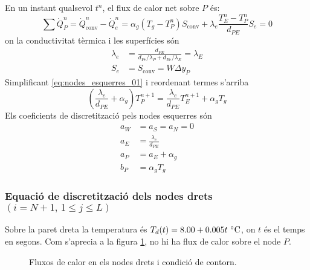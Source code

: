 \noindent
En un instant qualsevol $t^n$, el flux de calor net sobre $P$ és:
\begin{equation} \label{eq:nodes_esquerres_01}
	\sum \dot{Q}_P^n = 
	\dot{Q}_\text{conv}^n - \dot{Q}_e^n =
	\alpha_g \left( T_g - T_P^n \right) S_\text{conv} + 
	\lambda_e \frac{T_E^n - T_P^n}{d_{PE}} S_e = 0
\end{equation}
on la conductivitat tèrmica i les superfícies són
\begin{align}
	\lambda_e &= \frac{d_{PE}}{d_{Pe}/\lambda_P + d_{Ee}/\lambda_E} = \lambda_E \\
	S_e &= S_\text{conv} = W \Delta y_P 
\end{align}
Simplificant \eqref{eq:nodes_esquerres_01} i reordenant termes s'arriba 
\begin{equation} \label{eq:equacio_discretitzacio_nodes_esquerres}
	\left( \frac{\lambda_e}{d_{PE}} + \alpha_g \right) T_P^{n+1} = 
	\frac{\lambda_e}{d_{PE}} T_E^{n+1} + \alpha_g T_g
\end{equation}
Els coeficients de discretització pels nodes esquerres són
\begin{align}
	a_W &= a_S = a_N = 0 \\
	a_E &= \frac{\lambda_e}{d_{PE}} \\
	a_P &= a_E + \alpha_g \\
	b_P &= \alpha_g T_g
\end{align}


\subsubsection{Equació de discretització dels nodes drets \texorpdfstring{$\left( i = N+1, \, 1 \leq j \leq L \right)$}{}}

Sobre la paret dreta la temperatura és $T_d(t) = 8.00 + 0.005 t \ \celsius$, on $t$ és el temps en segons. Com s'aprecia a la figura \ref{fig:fluxos_calor_nodes_drets}, no hi ha flux de calor sobre el node $P$.

\begin{figure}[ht]
	\centering
	\captionsetup{width=0.45\textwidth}
	\caption{Fluxos de calor en els nodes drets i condició de contorn.}
	\label{fig:fluxos_calor_nodes_drets}
\end{figure}

